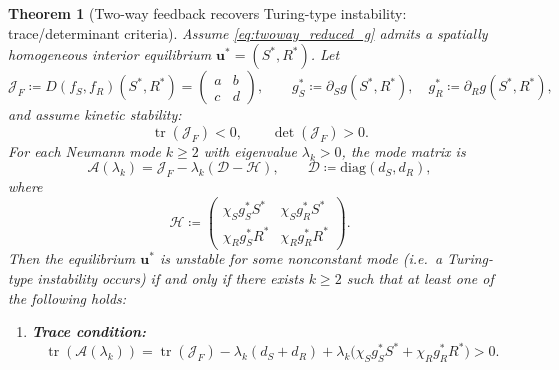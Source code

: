 \documentclass[pdflatex,sn-mathphys-ay]{sn-jnl}
\theoremstyle{thmstyleone}
\newtheorem{theorem}{Theorem}[section]
\theoremstyle{definition}
\theoremstyle{remark}
\begin{document}
\begin{theorem}[Two-way feedback recovers Turing-type instability: trace/determinant criteria]
\label{thm:twoway_criteria}
Assume \eqref{eq:twoway_reduced_g} admits a spatially homogeneous interior equilibrium $\mathbf{u}^*=(S^*,R^*)$.
Let
\[
\mathcal{J}_F \coloneqq D(f_S,f_R)(S^*,R^*)=
\begin{pmatrix}
a & b\\
c & d
\end{pmatrix},
\qquad
g_S^*\coloneqq \partial_S g(S^*,R^*),\quad g_R^*\coloneqq \partial_R g(S^*,R^*),
\]
and assume kinetic stability:
\begin{equation}
\label{eq:kinetic_stability_twoway}
\operatorname{tr}(\mathcal{J}_F)<0,\qquad \det(\mathcal{J}_F)>0.
\end{equation}
For each Neumann mode $k\ge2$ with eigenvalue $\lambda_k>0$, the mode matrix is
\[
\mathcal{A}(\lambda_k)=\mathcal{J}_F-\lambda_k(\mathcal{D}-\mathcal{H}),
\qquad
\mathcal{D}\coloneqq \mathrm{diag}(d_S,d_R),
\]
where
\[
\mathcal{H}\coloneqq
\begin{pmatrix}
\chi_S g_S^* S^* & \chi_S g_R^* S^*\\[4pt]
\chi_R g_S^* R^* & \chi_R g_R^* R^*
\end{pmatrix}.
\]
Then the equilibrium $\mathbf{u}^*$ is unstable for some nonconstant mode (i.e.\ a Turing-type instability occurs) if and only if
there exists $k\ge2$ such that at least one of the following holds:
\begin{enumerate}[label=(\alph*), leftmargin=*]
\item \textbf{Trace condition:}
\begin{equation}
\label{eq:twoway_trace_condition}
\operatorname{tr}(\mathcal{A}(\lambda_k))
=
\operatorname{tr}(\mathcal{J}_F)
-\lambda_k(d_S+d_R)
+\lambda_k\bigl(\chi_S g_S^* S^*+\chi_R g_R^* R^*\bigr)
>0.
\end{equation}


\end{enumerate}
\end{theorem}
\end{document}
